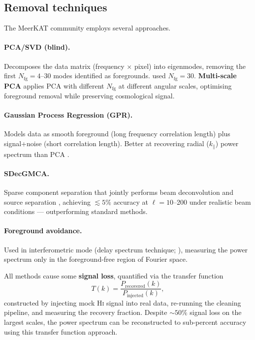 \documentclass[10pt,a4paper]{article}
\begin{document}
\subsection{Removal techniques}

The MeerKAT community employs several approaches.

\paragraph{PCA/SVD (blind).}
Decomposes the data matrix (frequency $\times$ pixel) into eigenmodes,
removing the first $N_{\mathrm{fg}} = 4$--30 modes identified as foregrounds.
\citet{Cunnington2023} used $N_{\mathrm{fg}} = 30$.  \textbf{Multi-scale PCA}
\citep{Carucci2025} applies PCA with different $N_{\mathrm{fg}}$ at different
angular scales, optimising foreground removal while preserving cosmological
signal.

\paragraph{Gaussian Process Regression (GPR).}
Models data as smooth foreground (long frequency correlation length) plus
signal+noise (short correlation length).  Better at recovering radial
($k_\parallel$) power spectrum than PCA \citep{Soares2022}.

\paragraph{SDecGMCA.}
Sparse component separation that jointly performs beam deconvolution and source
separation \citep{Gkogkou2025}, achieving $\lesssim\!5\%$ accuracy at
$\ell = 10$--200 under realistic beam conditions --- outperforming standard
methods.

\paragraph{Foreground avoidance.}
Used in interferometric mode (delay spectrum technique; \citealt{Paul2023}),
measuring the power spectrum only in the foreground-free region of Fourier
space.

All methods cause some \textbf{signal loss}, quantified via the transfer
function
\begin{equation}
  T(k) = \frac{P_{\mathrm{recovered}}(k)}{P_{\mathrm{injected}}(k)},
\end{equation}
constructed by injecting mock H\textsc{i} signal into real data, re-running the
cleaning pipeline, and measuring the recovery fraction.  Despite $\sim\!50\%$
signal loss on the largest scales, the power spectrum can be reconstructed to
sub-percent accuracy using this transfer function approach.
\end{document}
